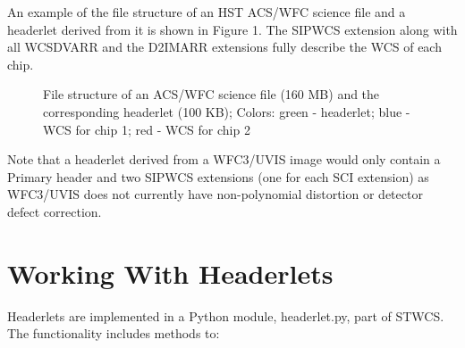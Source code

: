 An example of the file structure of an HST ACS/WFC science file and a headerlet derived from it is shown in Figure 1. The SIPWCS extension along with all WCSDVARR and the D2IMARR extensions fully describe the WCS of each chip.

\begin{figure}[!h]
\caption{File structure of an ACS/WFC science file (160 MB) and the corresponding headerlet (100 KB); Colors: green - headerlet; blue - WCS for chip 1; red - WCS for chip 2}
\end{figure}

Note that a headerlet derived from a WFC3/UVIS image would only contain a Primary header and two SIPWCS extensions (one for each SCI extension) as WFC3/UVIS does not currently have non-polynomial distortion or detector defect correction.

\section{Working With Headerlets}
Headerlets are implemented in a Python module, headerlet.py, part of STWCS. The functionality includes methods to:

